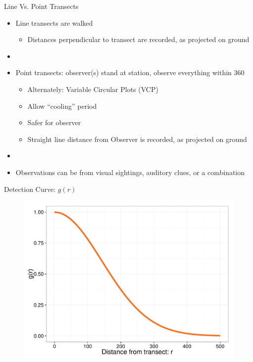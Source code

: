\documentclass{beamer}
\begin{document}
\begin{frame}{Line Vs. Point Transects}
	\begin{itemize}
	\item Line transects are walked
	\begin{itemize}
		\item Distances perpendicular to transect are recorded, as projected on ground
	\end{itemize}
	\item[]
	\item Point transects: observer(s) stand at station, observe everything within 360\textdegree 
		\begin{itemize}
		\item Alternately: Variable Circular Plots (VCP)
		\item Allow ``cooling'' period
		\item Safer for observer
		\item Straight line distance from Observer is recorded, as projected on ground
		\end{itemize}
	\item[]		
	\item Observations can be from visual sightings, auditory clues, or a combination
	\end{itemize}
\end{frame}

\begin{frame}{Detection Curve: $g(r)$}
	\begin{figure}
		\centering
		\includegraphics[width=\textwidth,height=0.80\textheight,keepaspectratio=true]{../images/detectionCurve.pdf}
	\end{figure}
\end{frame}
\end{document}
